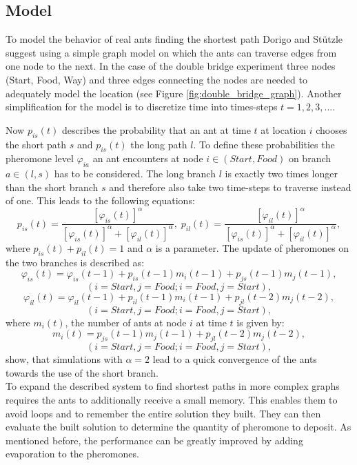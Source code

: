 \subsection{Model}
To model the behavior of real ants finding the shortest path Dorigo and Stützle \cite{DBLP:books/daglib/0013523} suggest using a simple graph model on which the ants can traverse edges from one node to the next. In the case of the double bridge experiment three nodes (Start, Food, Way) and three edges connecting the nodes are needed to adequately model the location (see Figure \ref{fig:double_bridge_graph}). Another simplification for the model is to discretize time into times-steps $t = 1,2,3,...$.

Now $p_{is}(t)$ describes the probability that an ant at time $t$ at location $i$ chooses the short path $s$ and $p_{is}(t)$ the long path $l$. To define these probabilities the pheromone level $\varphi_{ia}$ an ant encounters at node $i\in{(Start,Food)}$ on branch $a \in {(l, s)}$ has to be considered. The long branch $l$ is exactly two times longer than the short branch $s$ and therefore also take two time-steps to traverse instead of one. This leads to the following equations:
$$p_{is}(t) = \frac{[\varphi_{is}(t)]^\alpha}{[\varphi_{is}(t)]^\alpha + [\varphi_{il}(t)]^\alpha}, \;p_{il}(t) = \frac{[\varphi_{il}(t)]^\alpha}{[\varphi_{is}(t)]^\alpha + [\varphi_{il}(t)]^\alpha},$$
where $p_{is}(t) + p_{il}(t) = 1$ and $\alpha$ is a parameter. The update of pheromones on the two branches is described as:
$$\varphi_{is}(t) = \varphi_{is}(t-1) + p_{is}(t-1)m_i(t-1) + p_{js}(t-1)m_j(t-1),$$
$$(i = Start, j = Food; i = Food, j = Start),$$
$$\varphi_{il}(t) = \varphi_{il}(t-1) + p_{il}(t-1)m_i(t-1) + p_{jl}(t-2)m_j(t-2),$$
$$(i = Start, j = Food; i = Food, j = Start),$$
where $m_i(t)$, the number of ants at node $i$ at time $t$ is given by:
$$m_i(t) =  p_{js}(t-1)m_j(t-1) + p_{jl}(t-2)m_j(t-2),$$
$$(i = Start, j = Food; i = Food, j = Start),$$
\cite{DBLP:books/daglib/0013523} show, that simulations with $\alpha = 2$ lead to a quick convergence of the ants towards the use of the short branch.\\
To expand the described system to find shortest paths in more complex graphs requires the ants to additionally receive a small memory. This enables them to avoid loops and to remember the entire solution they built. They can then evaluate the built solution to determine the quantity of pheromone to deposit. As mentioned before, the performance can be greatly improved by adding evaporation to the pheromones.

